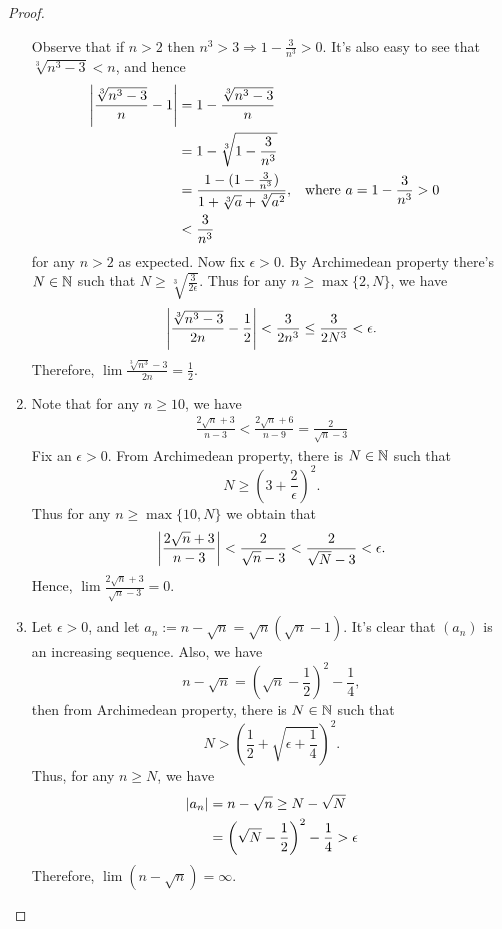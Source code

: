 \begin{proof}
\begin{enumerate}
      Observe that if $n>2$ then $n^3>3\Rightarrow 1-\frac{3}{n^3}>0$.
      It's also easy to see that $\sqrt[3]{n^3-3}<n$, and hence
      \begin{align*}
        \abs*{\frac{\sqrt[3]{n^3-3}}{n}-1}
        &=1-\frac{\sqrt[3]{n^3-3}}{n}\\
        &=1-\sqrt[3]{1-\frac{3}{n^3}}\\
        &=\frac{1-(1-\frac{3}{n^3})}{1+\sqrt[3]{a}+\sqrt[3]{a^2}},
        &&\text{where $a=1-\frac{3}{n^3}>0$}\\
        &<\frac{3}{n^3}
      \end{align*}
      for any $n>2$ as expected. Now fix $\epsilon>0$. By Archimedean 
      property there's $N\in\N$ such that 
      $N\geq \sqrt[3]{\frac{3}{2\epsilon}}$. Thus for any 
      $n\geq\max\{2,N\}$, we have
      \begin{align*}
        \abs*{\frac{\sqrt[3]{n^3-3}}{2n}-\frac{1}{2}}
        <\frac{3}{2n^3}\leq\frac{3}{2N^3}<\epsilon.
      \end{align*}
      Therefore, $\boxed{\lim\frac{\sqrt[3]{n^3}-3}{2n}=\frac{1}{2}.}$

    \item Note that for any $n\geq 10$, we have
      \begin{align*}
        \frac{2\sqrt{n}+3}{n-3}
        <\frac{2\sqrt{n}+6}{n-9}
        =\frac{2}{\sqrt{n}-3}
      \end{align*}
      Fix an $\epsilon>0$. From Archimedean property, there
      is $N\in\N$ such that 
      \[ N\geq \left(3+\frac{2}{\epsilon}\right)^2. \]
      Thus for any $n\geq\max\{10, N\}$ we obtain that
      \begin{align*}
        \abs*{\frac{2\sqrt{n}+3}{n-3}}
        <\frac{2}{\sqrt{n}-3}
        <\frac{2}{\sqrt{N}-3}<\epsilon.
      \end{align*}
      Hence, \quad
      $\boxed{\lim\frac{2\sqrt{n}+3}{\sqrt{n}-3}=0}$.

    \item Let $\epsilon>0$, and let 
      $a_n:=n-\sqrt{n}=\sqrt{n}(\sqrt{n}-1)$.
      It's clear that $(a_n)$ is an increasing sequence.
      Also, we have
      \[ n-\sqrt{n}=\left(\sqrt{n}-\frac{1}{2}\right)^2-\frac{1}{4},\]
      then from Archimedean property, there is $N\in\N$ such that
      \[N> \left(\frac{1}{2}+\sqrt{\epsilon+\frac{1}{4}}\right)^2.\]
      Thus, for any $n\geq N$, we have
      \begin{align*}
        \abs{a_n}
        &=n-\sqrt n\geq N-\sqrt N\\
        &=\left(\sqrt{N}-\frac{1}{2}\right)^2-\frac{1}{4}
        >\epsilon
      \end{align*}
      Therefore, $\boxed{\lim (n-\sqrt n)=\infty.}$
  \end{enumerate}
\end{proof}






